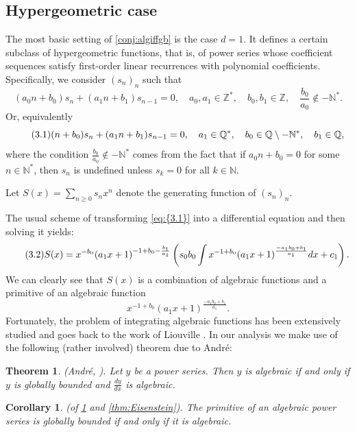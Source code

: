 \documentclass[11pt]{article}
\theoremstyle{definition}
\theoremstyle{plain}
\newtheorem{thm}[defi]{Theorem}
\newtheorem{cor}[defi]{Corollary}
\theoremstyle{remark}
\begin{document}
\subsection{Hypergeometric case}\label{subsection: order 1}
The most basic setting of \cref{conj:algiffgb} is the case $d=1$. 
It defines a certain subclass of hypergeometric functions, that is, of power series whose coefficient sequences satisfy first-order linear recurrences with polynomial coefficients. Specifically, we consider $(s_n)_n$ such that 
\[(a_0n+b_0)s_n+(a_1n+b_1)s_{n-1}=0, \quad  a_0,a_1 \in \mathbb{Z}^*, \quad b_0,b_1 \in \mathbb{Z}, \quad \frac{b_0}{a_0} \not\in -\mathbb{N}^*.\]
Or, equivalently
\begin{equation}\label{eq:{3.1}}\tag{3.1}
(n+b_0)s_n+(a_1n+b_1)s_{n-1}=0, \quad a_1 \in \mathbb{Q}^*, \quad b_0 \in \mathbb{Q}\setminus -\mathbb{N}^*, \quad b_1 \in \mathbb{Q},
\end{equation}
where the condition $\frac{b_0}{a_0} \not\in -\mathbb{N}^*$ comes from the fact that if $a_0n+b_0 = 0$ for some $n \in \mathbb{N}^*$, then $s_n$ is undefined unless $s_k=0$ for all $k \in \mathbb{N}$.

Let $S(x) = \sum\limits_{n\geq0} s_nx^n$ denote the generating function of $(s_n)_n$.

The usual scheme of transforming \eqref{eq:{3.1}} into a differential equation and then solving it yields:
\begin{equation}\label{eq:{3.2}}\tag{3.2}
S(x) = x^{-b_0}(a_1x + 1)^{-1+b_0 - \frac{b_1}{a_1}} \left(s_0b_0\int x^{-1 + b_0}(a_1x + 1)^{\frac{-a_1b_0 + b_1}{a_1}}dx + c_1\right).
\end{equation}
We can clearly see that $S(x)$ is a combination of algebraic functions and a primitive of an algebraic function 
\[x^{-1 + b_0}(a_1x + 1)^{\frac{-a_1b_0 + b_1}{a_1}}.\] Fortunately, the problem of integrating algebraic functions has been extensively studied and goes back to the work of Liouville \cite[Chapter IX]{Lu12}. In our analysis we make use of the following (rather involved) theorem due to André:

\begin{thm}\label{thm:André}
(André, \cite[p.~149]{And89}).
Let $y$ be a power series. Then $y$ is algebraic if and only if $y$ is globally bounded and $\frac{dy}{dx}$ is algebraic.
\end{thm}

\begin{cor} (of \cref{thm:André} and \cref{thm:Eisenstein}).
The primitive of an algebraic power series is
globally bounded if and only if it is algebraic. 
\end{cor}
\end{document}
